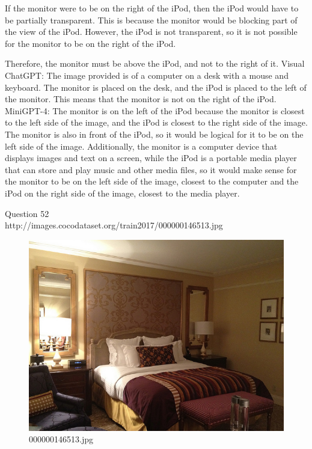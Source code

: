 \begin{enumerate}
    If the monitor were to be on the right of the iPod, then the iPod would have to be partially transparent. This is because the monitor would be blocking part of the view of the iPod. However, the iPod is not transparent, so it is not possible for the monitor to be on the right of the iPod.

    Therefore, the monitor must be above the iPod, and not to the right of it.
    \subitem Visual ChatGPT: The image provided is of a computer on a desk with a mouse and keyboard. The monitor is placed on the desk, and the iPod is placed to the left of the monitor. This means that the monitor is not on the right of the iPod.
    \subitem MiniGPT-4: The monitor is on the left of the iPod because the monitor is closest to the left side of the image, and the iPod is closest to the right side of the image. The monitor is also in front of the iPod, so it would be logical for it to be on the left side of the image. Additionally, the monitor is a computer device that displays images and text on a screen, while the iPod is a portable media player that can store and play music and other media files, so it would make sense for the monitor to be on the left side of the image, closest to the computer and the iPod on the right side of the image, closest to the media player.
\end{enumerate}
Question 52\\
http://images.cocodataset.org/train2017/000000146513.jpg
\begin{figure}[h]
    \centering
    \includegraphics[width=0.8\linewidth]{../image set/hard/000000146513.jpg}
    \caption{000000146513.jpg}
\end{figure}
